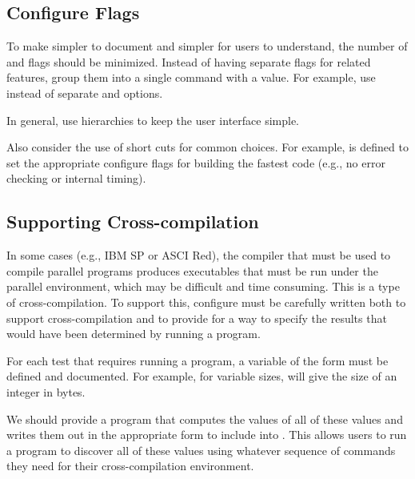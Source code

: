 \documentclass{article}
\begin{document}
\subsection{Configure Flags}
\label{sec:config-flags}
To make  simpler to document and simpler for users to
understand, the number of  and  flags should be
minimized.  Instead of having separate  flags for related
features, group them into a single  command with a value.
For example, use  instead of separate
 and  options.  

In general, use hierarchies to keep the user interface simple.

Also consider the use of short cuts for common choices.  For example, 
 is defined to set the appropriate configure
flags for building the fastest code (e.g., no error checking or
internal timing).

\subsection{Supporting Cross-compilation}
\label{sec:cross-compile}
In some cases (e.g., IBM SP or ASCI Red), the compiler that must be used to
compile parallel programs produces executables that must be run under
the parallel environment, which may be difficult and time consuming.
This is a type of cross-compilation.  To support this, configure must
be carefully written both to support cross-compilation and to provide
for a way to specify the results that would have been determined by
running a program.

For each test that requires running a program, a variable of the form
 must be defined and documented.  For example, for
variable sizes,  will give the size of an
integer in bytes.

We should provide a program that computes the values of all of these
values and writes them out in the appropriate form to include into
.  This allows users to run a program to discover all
of these values using whatever sequence of commands they need for
their cross-compilation environment.
\end{document}

